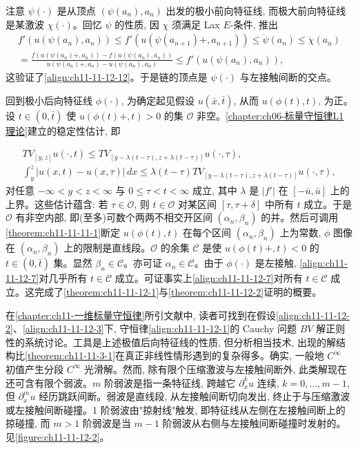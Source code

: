 \documentclass[../../main.tex]{subfiles}
\begin{document}
注意 $\psi(\cdot)$ 是从顶点 $(\psi(a_n),a_n)$ 出发的极小前向特征线, 而极大前向特征线是某激波 $\chi(\cdot)$。回忆 $\psi$ 的性质, 因 $\chi$ 须满足 Lax $E$-条件, 推出
\begin{align}
f'(u(\psi(a_n),a_n))\leqslant f'(u(\psi(a_{n+1})+,a_{n+1}))\leqslant\dot{\psi}(a_n)\leqslant\dot{\chi}(a_n)\nonumber\\
=\frac{f(u(\psi(a_n)+,a_n))-f(u(\psi(a_n),a_n))}{u(\psi(a_n)+,a_n)-u(\psi(a_n),a_n)}\leqslant f'(u(\psi(a_n),a_n)),\label{align:ch11-11-12-17}
\end{align}
这验证了\eqref{align:ch11-11-12-12}。于是链的顶点是 $\psi(\cdot)$ 与左接触间断的交点。

回到极小后向特征线 $\phi(\cdot)$, 为确定起见假设 $u(\bar x,\bar t)$, 从而 $u(\phi(t),t)$, 为正。设 $t\in(0,\bar t)$ 使 $u(\phi(t)+,t)>0$ 的集 $\mathscr{O}$ 非空。\cref{chapter:ch06-标量守恒律L1理论}建立的稳定性估计, 即

\begin{align}
TV_{[y,z]}u(\cdot,t)\leqslant TV_{[y-\lambda(t-\tau),z+\lambda(t-\tau)]}u(\cdot,\tau),\label{align:ch11-11-12-18}\\
\int_y^z|u(x,t)-u(x,\tau)|\,dx\leqslant\lambda(t-\tau)TV_{[y-\lambda(t-\tau),z+\lambda(t-\tau)]}u(\cdot,\tau),\label{align:ch11-11-12-19}
\end{align}
对任意 $-\infty<y<z<\infty$ 与 $0\leqslant\tau<t<\infty$ 成立, 其中 $\lambda$ 是 $|f'|$ 在 $[-\bar u,\bar u]$ 上的上界。这些估计蕴含: 若 $\tau\in\mathscr{O}$, 则 $t\in\mathscr{O}$ 对某区间 $[\tau,\tau+\delta]$ 中所有 $t$ 成立。于是 $\mathscr{O}$ 有非空内部, 即(至多)可数个两两不相交开区间 $(\alpha_n,\beta_n)$ 的并。然后可调用\cref{theorem:ch11-11-11-1}断定 $u(\phi(t),t)$ 在每个区间 $(\alpha_n,\beta_n)$ 上为常数, $\phi$ 图像在 $(\alpha_n,\beta_n)$ 上的限制是直线段。$\mathscr{O}$ 的余集 $\mathscr{C}$ 是使 $u(\phi(t)+,t)<0$ 的 $t\in(0,\bar t)$ 集。显然 $\beta_n\in\mathscr{C}$。亦可证 $\alpha_n\in\mathscr{C}$。由于 $\phi(\cdot)$ 是左接触, \eqref{align:ch11-11-12-7}对几乎所有 $t\in\mathscr{C}$ 成立。可证事实上\eqref{align:ch11-11-12-7}对所有 $t\in\mathscr{C}$ 成立。这完成了\cref{theorem:ch11-11-12-1}与\cref{theorem:ch11-11-12-2}证明的概要。

在\cref{chapter:ch11-一维标量守恒律}所引文献中, 读者可找到在假设\eqref{align:ch11-11-12-2}、\eqref{align:ch11-11-12-3}下, 守恒律\eqref{align:ch11-11-12-1}的 Cauchy 问题 $BV$ 解正则性的系统讨论。工具是上述极值后向特征线的性质, 但分析相当技术, 出现的解结构比\cref{theorem:ch11-11-3-1}在真正非线性情形遇到的复杂得多。确实, 一般地 $C^\infty$ 初值产生分段 $C^\infty$ 光滑解。然而, 除有限个压缩激波与左接触间断外, 此类解现在还可含有限个弱波。$m$ 阶弱波是指一条特征线, 跨越它 $\partial_x^k u$ 连续, $k=0,\ldots,m-1$, 但 $\partial_x^m u$ 经历跳跃间断。弱波是直线段, 从左接触间断切向发出, 终止于与压缩激波或左接触间断碰撞。1 阶弱波由"掠射线"触发, 即特征线从左侧在左接触间断上的掠碰撞, 而 $m>1$ 阶弱波是当 $m-1$ 阶弱波从右侧与左接触间断碰撞时发射的。见\cref{figure:ch11-11-12-2}。
\end{document}
